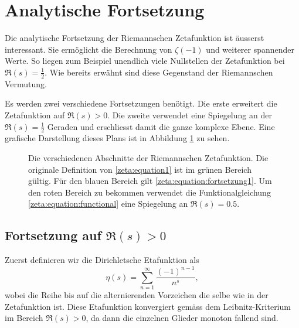 \section{Analytische Fortsetzung} \label{zeta:section:analytische_fortsetzung}

Die analytische Fortsetzung der Riemannschen Zetafunktion ist äusserst interessant.
Sie ermöglicht die Berechnung von $\zeta(-1)$ und weiterer spannender Werte.
So liegen zum Beispiel unendlich viele Nullstellen der Zetafunktion bei $\Re(s) = \frac{1}{2}$.
Wie bereits erwähnt sind diese Gegenstand der Riemannschen Vermutung.

Es werden zwei verschiedene Fortsetzungen benötigt.
Die erste erweitert die Zetafunktion auf $\Re(s) > 0$.
Die zweite verwendet eine Spiegelung an der $\Re(s) = \frac{1}{2}$ Geraden und erschliesst damit die ganze komplexe Ebene.
Eine grafische Darstellung dieses Plans ist in Abbildung \ref{zeta:fig:continuation_overview} zu sehen.
\begin{figure}
    \centering
    
    \caption{
        Die verschiedenen Abschnitte der Riemannschen Zetafunktion.
        Die originale Definition von \eqref{zeta:equation1} ist im grünen Bereich gültig.
        Für den blauen Bereich gilt \eqref{zeta:equation:fortsetzung1}.
        Um den roten Bereich zu bekommen verwendet die Funktionalgleichung \eqref{zeta:equation:functional} eine Spiegelung an $\Re(s) = 0.5$.
    }
    \label{zeta:fig:continuation_overview}
\end{figure}

\subsection{Fortsetzung auf $\Re(s) > 0$} \label{zeta:subsection:auf_bereich_ge_0}
Zuerst definieren wir die Dirichletsche Etafunktion als
\begin{equation}\label{zeta:equation:eta}
    \eta(s)
    =
    \sum_{n=1}^{\infty}
    \frac{(-1)^{n-1}}{n^s},
\end{equation}
wobei die Reihe bis auf die alternierenden Vorzeichen die selbe wie in der Zetafunktion ist.
Diese Etafunktion konvergiert gemäss dem Leibnitz-Kriterium im Bereich $\Re(s) > 0$, da dann die einzelnen Glieder monoton fallend sind.


